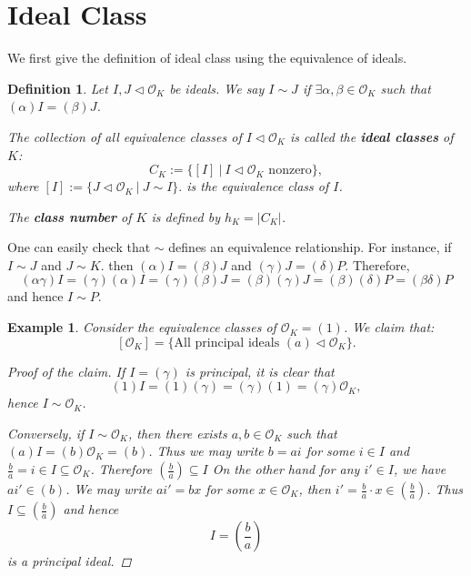 \documentclass[11pt]{book}
\newtheorem{definition}[theorem]{Definition}
\newtheorem{example}[theorem]{Example}
\begin{document}
\section{Ideal Class}
We first give the definition of ideal class using the equivalence of ideals.
\begin{definition}
    Let $I, J\lhd \mathcal{O}_{K}$ be ideals. We say $I\sim J$ if $\exists \alpha,\beta \in \mathcal{O}_{K}$ such that $(\alpha)I=(\beta)J$. 

    The collection of all equivalence classes of $I\lhd \mathcal{O}_{K}$ is called the {\bf ideal classes} of $K$:
    \[
    C_{K}:=\{[I]\ |\ I\lhd \mathcal{O}_{K} \text{ nonzero}\},
    \]
    where 
    \(
    [I]:=\{J\lhd \mathcal{O}_{K}\ |\ J\sim I\}. 
    \) is the equivalence class of $I$.
\medskip

    The {\bf class number} of $K$ is defined by $h_{K}=\left| C_{K} \right| $.
\end{definition}
One can easily check that $\sim$ defines an equivalence relationship. For instance, if $I \sim J$ and $J \sim K$. then $(\alpha)I = (\beta)J$ and $(\gamma)J = (\delta)P$. Therefore, 
    $$(\alpha\gamma)I = (\gamma)(\alpha)I = (\gamma)(\beta)J = (\beta)(\gamma)J = (\beta)(\delta)P = (\beta\delta)P$$
    and hence $I \sim P$.


\begin{example}
    Consider the equivalence classes of $\mathcal{O}_{K}=(1)$. We claim that:
    \[
    [\mathcal{O}_{K}]=\{\text{All principal ideals } (a)\lhd \mathcal{O}_{K}\}. 
    \]

    \begin{proof}[Proof of the claim]
        If $I=(\gamma)$ is principal, it is clear that 
        \[
        (1)I=(1)(\gamma)=(\gamma)(1)=(\gamma)\mathcal{O}_{K},
        \]
        hence $I\sim \mathcal{O}_{K}$. 

        Conversely, if $I\sim \mathcal{O}_{K}$, then there exists $a,b\in \mathcal{O}_{K}$ such that $(a)I=(b)\mathcal{O}_{K}=(b)$. Thus we may write $b=ai$ for some $i\in I$ and $\frac{b}{a}=i\in I\subseteq \mathcal{O}_{K}$. Therefore $(\frac{b}{a})\subseteq I$ On the other hand for any $i'\in I$, we have $ai'\in (b)$. We may write $ai'=bx$ for some $x\in \mathcal{O}_{K}$, then $i'=\frac{b}{a}\cdot x\in (\frac{b}{a})$. Thus $I\subseteq (\frac{b}{a})$ and hence
        $$I = (\frac{b}{a})$$
        is a principal ideal.
    \end{proof}
\end{example}
\end{document}
